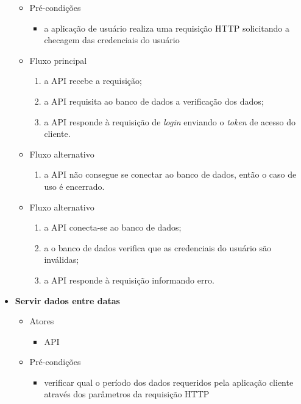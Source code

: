 \begin{itemize}
\begin{itemize}
		    \item Pré-condições
			    \begin{itemize}
			        \item a aplicação de usuário realiza uma requisição HTTP solicitando a checagem das credenciais do usuário
			    \end{itemize}

		    \item Fluxo principal
			    \begin{enumerate}
			    	\item a API recebe a requisição;
			        \item a API requisita ao banco de dados a verificação dos dados;			
			        \item a API responde à requisição de \textit{login} enviando o \textit{token} de acesso do cliente.			     
			    \end{enumerate}

			\item Fluxo alternativo
			    \begin{enumerate}
			        \item a API não consegue se conectar ao banco de dados, então o caso de uso é encerrado.
			    \end{enumerate}
    
		    \item Fluxo alternativo
			    \begin{enumerate}
			        \item a API conecta-se ao banco de dados;
	        		\item a o banco de dados verifica que as credenciais do usuário são inválidas;
			        \item a API responde à requisição informando erro.
			    \end{enumerate}
		\end{itemize}
		
	\item \textbf{Servir dados entre datas}

		\begin{itemize}
    		\item Atores
			    \begin{itemize}
    	    		\item API
			    \end{itemize}

		    \item Pré-condições
			    \begin{itemize}
     		   		\item verificar qual o período dos dados requeridos pela aplicação cliente através dos parâmetros da requisição HTTP
			    \end{itemize}


\end{itemize}
\end{itemize}
